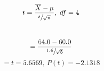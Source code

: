 \[ t=\frac{\overline{X}-\mu}{\sfrac{s}{\sqrt{n}}}, \ df=4 \]\\
    \[ =\frac{64.0-60.0}{\sfrac{1.6}{\sqrt{5}}} \]
    \[ =t=5.6569, \ P(t)=-2.1318 \]